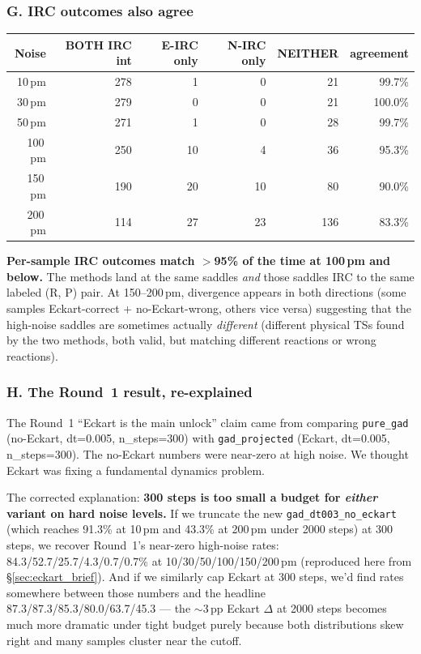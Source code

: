 \documentclass[11pt]{article}
\begin{document}
\subsubsection*{G. IRC outcomes also agree}

\begin{center}
\begin{tabular}{rrrrrr}
\toprule
Noise & BOTH IRC int & E-IRC only & N-IRC only & NEITHER & agreement \\
\midrule
10\,pm  & 278 & 1  & 0  & 21  & 99.7\% \\
30\,pm  & 279 & 0  & 0  & 21  & 100.0\% \\
50\,pm  & 271 & 1  & 0  & 28  & 99.7\% \\
100\,pm & 250 & 10 & 4  & 36  & 95.3\% \\
150\,pm & 190 & 20 & 10 & 80  & 90.0\% \\
200\,pm & 114 & 27 & 23 & 136 & 83.3\% \\
\bottomrule
\end{tabular}
\end{center}

\textbf{Per-sample IRC outcomes match $>$95\% of the time at 100\,pm and
below.} The methods land at the same saddles \emph{and} those saddles
IRC to the same labeled (R, P) pair. At 150--200\,pm, divergence
appears in both directions (some samples Eckart-correct + no-Eckart-wrong,
others vice versa) suggesting that the high-noise saddles are sometimes
actually \emph{different} (different physical TSs found by the two
methods, both valid, but matching different reactions or wrong reactions).

\subsubsection*{H. The Round~1 result, re-explained}

The Round~1 ``Eckart is the main unlock'' claim came from comparing
\texttt{pure\_gad} (no-Eckart, dt=0.005, n\_steps=300) with
\texttt{gad\_projected} (Eckart, dt=0.005, n\_steps=300). The
no-Eckart numbers were near-zero at high noise. We thought Eckart was
fixing a fundamental dynamics problem.

The corrected explanation: \textbf{300 steps is too small a budget for
\emph{either} variant on hard noise levels.} If we truncate the new
\texttt{gad\_dt003\_no\_eckart} (which reaches 91.3\% at 10\,pm and
43.3\% at 200\,pm under 2000 steps) at 300 steps, we recover Round~1's
near-zero high-noise rates: 84.3/52.7/25.7/4.3/0.7/0.7\% at 10/30/50/100/150/200\,pm
(reproduced here from \S\ref{sec:eckart_brief}). And if we similarly
cap Eckart at 300 steps, we'd find rates somewhere between those
numbers and the headline 87.3/87.3/85.3/80.0/63.7/45.3 --- the
$\sim$3\,pp Eckart $\Delta$ at 2000 steps becomes much more dramatic
under tight budget purely because both distributions skew right and
many samples cluster near the cutoff.
\end{document}
